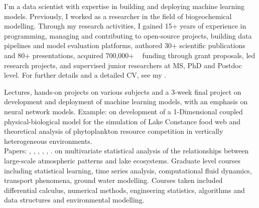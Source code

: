 \documentclass[
	a4paper,
]{fortysecondscv}
\begin{document}
\makefrontsidebar


I'm a data scientist with expertise in building and deploying machine learning models. Previously, I worked as a researcher in the field of biogeochemical modelling. Through my research activities, I gained 15+ years of experience in programming, managing and contributing to open-source projects, building data pipelines and model evaluation platforms, authored 30+ scientific publications and 80+  presentations, acquired 700,000+ \texteuro~ funding through grant proposals, led research projects, and supervised junior researchers at MS, PhD and Postdoc level. For further details and a detailed CV, see my \href{https://sites.google.com/view/onur-kerimoglu}{\color{pblue}{website}}.

\begin{cvtable}[1.5]
		{Lectures, hands-on projects on various subjects and a 3-week final project on development and deployment of machine learning models, with an emphasis on neural network models. Example: \href{https://github.com/OnurKerimoglu/Dengue}{\color{pblue}{disease prediction}}}
		{\href{https://kops.uni-konstanz.de/bitstream/handle/123456789/16454/Kerimoglu_2011_PhD_Dissertation.pdf?isAllowed=y&sequence=1}{\color{pblue}{Thesis}} on development of a 1-Dimensional coupled physical-biological model for the simulation of Lake Constance food web and theoretical analysis of phytoplankton resource competition in vertically heterogeneous environments.\\Papers:
		\href{https://doi.org/10.1111/j.1365-2486.2009.02158.x}{\color{pblue}{1}}, 
		\href{https://doi.org/10.1016/j.jtbi.2012.01.044}{\color{pblue}{2}}, 
		\href{https://doi.org/10.1007/s12080-012-0164-2}{\color{pblue}{3}}, 
		\href{https://doi.org/10.1111/j.1600-0706.2012.20603.x}{\color{pblue}{4}}, 
		\href{https://doi.org/10.1007/s10750-013-1551-4}{\color{pblue}{5}}, 
		\href{https://doi.org/10.1890/14-0839.1}{\color{pblue}{6}}.
		}
		{\href{http://etd.lib.metu.edu.tr/upload/12609272/index.pdf}{\color{pblue}{Thesis}} on multivariate statistical analysis of the relationships between large-scale atmospheric patterns and lake ecosystems. Graduate level courses including statistical learning, time series analysis, computational fluid dynamics, transport phenomena, ground water modelling.}
		{Courses taken included differential calculus, numerical methods, engineering statistics, algorithms and data structures and environmental modelling.}
\end{cvtable}
\end{document}
